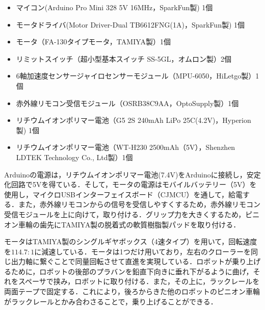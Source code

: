 \begin{itemize}
    \item マイコン(Arduino Pro Mini 328 5V 16MHz，SparkFun製) 1個
    \item モータドライバ(Motor Driver-Dual TB6612FNG(1A)，SparkFun製) 1個
    \item モータ（FA-130タイプモータ，TAMIYA製）1個
    \item リミットスイッチ（超小型基本スイッチ SS-5GL，オムロン製）2個
    \item 6軸加速度センサージャイロセンサーモジュール（MPU-6050，HiLetgo製）1個
    \item 赤外線リモコン受信モジュール（OSRB38C9AA，OptoSupply製）1個
    \item リチウムイオンポリマー電池（G5 2S 240mAh LiPo 25C(4.2V)，Hyperion製) 1個
    \item リチウムイオンポリマー電池（WT-H230 2500mAh（5V），Shenzhen LDTEK Technology Co., Ltd製）1個
\end{itemize}

Arduinoの電源は，リチウムイオンポリマー電池(7.4V)をArduinoに接続し，安定化回路で5Vを得ている．そして，モータの電源はモバイルバッテリー（5V）を使用し，マイクロUSBインターフェイスボード（CJMCU）を通して，給電する．また，赤外線リモコンからの信号を受信しやすくするため，赤外線リモコン受信モジュールを上に向けて，取り付ける．グリップ力を大きくするため，ピニオン車輪の歯先にTAMIYA製の脱着式の軟質樹脂製パッドを取り付ける．

モータはTAMIYA製のシングルギヤボックス（4速タイプ）を用いて，回転速度を$114.7:1$に減速している．モータは1つだけ用いており，左右のクローラーを同じ出力軸に繋ぐことで同量回転させて直進を実現している．ロボットが乗り上げるために，ロボットの後部のプラバンを鉛直下向きに垂れ下がるように曲げ，それをスペーサで挟み，ロボットに取り付ける．また，その上に，ラックレールを両面テープで固定する．これにより，後ろからきた他のロボットのピニオン車輪がラックレールとかみ合わさることで，乗り上げることができる．

